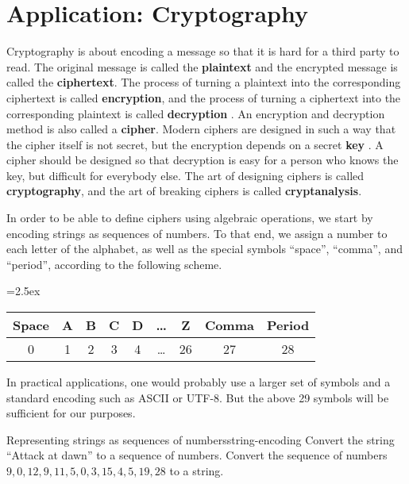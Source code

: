 \section{Application: Cryptography}

\begingroup
\newcommand{\qq}[1]{\mbox{#1}}
\newcommand{\q}[1]{\qq{``#1''}}

Cryptography is about encoding a message so that it is hard for a
third party to read. The original message is called the
\textbf{plaintext} and the
encrypted message is called the
\textbf{ciphertext}. The
process of turning a plaintext into the corresponding ciphertext is
called \textbf{encryption},
and the process of turning a ciphertext into the corresponding
plaintext is called \textbf{decryption}%
. An encryption and decryption method is also
called a \textbf{cipher}.  Modern ciphers are designed
in such a way that the cipher itself is not secret, but the encryption
depends on a secret \textbf{key}%
. A cipher should be designed so that decryption is
easy for a person who knows the key, but difficult for everybody
else. The art of designing ciphers is called
\textbf{cryptography}, and the art of breaking
ciphers is called \textbf{cryptanalysis}.

In order to be able to define ciphers using algebraic operations, we
start by encoding strings as sequences of numbers. To that end, we
assign a number to each letter of the alphabet, as well as the special
symbols ``space'', ``comma'', and ``period'', according to the
following scheme.
\begin{center}
  \tabcolsep=2.5ex
  \begin{tabular}{|c|c|c|c|c|c|c|c|c|}
    \hline
    Space & A & B & C & D & \ldots & Z & Comma & Period \\\hline
    0 & 1 & 2 & 3 & 4 & \ldots & 26 & 27 & 28 \\\hline
  \end{tabular}
\end{center}
In practical applications, one would probably use a larger set of
symbols and a standard encoding such as ASCII or UTF-8. But the above
29 symbols will be sufficient for our purposes.

\begin{example}{Representing strings as sequences of numbers}{string-encoding}
  Convert the string ``Attack at dawn'' to a sequence of
  numbers. Convert the sequence of numbers
  $9,0,12,9,11,5,0,3,15,4,5,19,28$ to a string.
\end{example}

